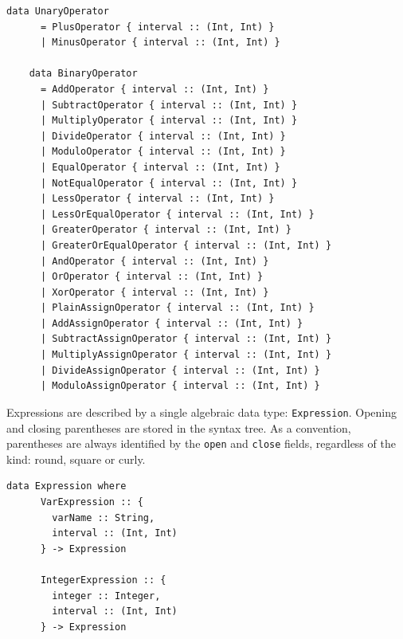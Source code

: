 \documentclass[UdineBachThesis,american,11pt]{PhdThesis}
\begin{document}
  \begin{Verbatim}[gobble=4,fontsize=\small]
    data UnaryOperator
      = PlusOperator { interval :: (Int, Int) }
      | MinusOperator { interval :: (Int, Int) }

    data BinaryOperator
      = AddOperator { interval :: (Int, Int) }
      | SubtractOperator { interval :: (Int, Int) }
      | MultiplyOperator { interval :: (Int, Int) }
      | DivideOperator { interval :: (Int, Int) }
      | ModuloOperator { interval :: (Int, Int) }
      | EqualOperator { interval :: (Int, Int) }
      | NotEqualOperator { interval :: (Int, Int) }
      | LessOperator { interval :: (Int, Int) }
      | LessOrEqualOperator { interval :: (Int, Int) }
      | GreaterOperator { interval :: (Int, Int) }
      | GreaterOrEqualOperator { interval :: (Int, Int) }
      | AndOperator { interval :: (Int, Int) }
      | OrOperator { interval :: (Int, Int) }
      | XorOperator { interval :: (Int, Int) }
      | PlainAssignOperator { interval :: (Int, Int) }
      | AddAssignOperator { interval :: (Int, Int) }
      | SubtractAssignOperator { interval :: (Int, Int) }
      | MultiplyAssignOperator { interval :: (Int, Int) }
      | DivideAssignOperator { interval :: (Int, Int) }
      | ModuloAssignOperator { interval :: (Int, Int) }
  \end{Verbatim}

  Expressions are described by a single algebraic data type:
  \mbox{\texttt{Expression}}. Opening and closing parentheses are stored in the
  syntax tree. As a convention, parentheses are always identified by the
  \mbox{\texttt{open}} and \mbox{\texttt{close}} fields, regardless of the kind:
  round, square or curly.

  \begin{Verbatim}[gobble=4,fontsize=\small]
    data Expression where
      VarExpression :: {
        varName :: String,
        interval :: (Int, Int)
      } -> Expression

      IntegerExpression :: {
        integer :: Integer,
        interval :: (Int, Int)
      } -> Expression
  \end{Verbatim}

  \pagebreak
\end{document}
